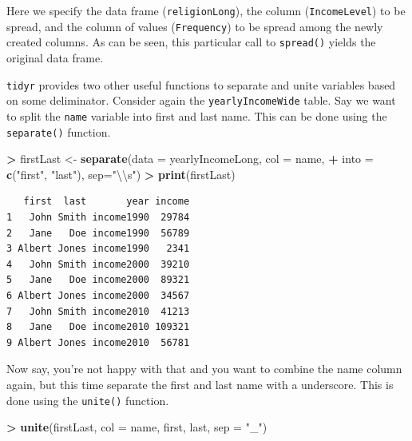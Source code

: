 \documentclass[]{krantz}
\makeatletter
\newenvironment{Shaded}{\begin{snugshade}}{\end{snugshade}}
\newcommand{\CharTok}[1]{\textcolor[rgb]{0.5,0.5,0.5}{#1}}
\newcommand{\DataTypeTok}[1]{\textcolor[rgb]{0.27,0.27,0.27}{#1}}
\newcommand{\KeywordTok}[1]{\textcolor[rgb]{0.27,0.27,0.27}{\textbf{#1}}}
\newcommand{\NormalTok}[1]{#1}
\newcommand{\OperatorTok}[1]{\textcolor[rgb]{0.43,0.43,0.43}{\textbf{#1}}}
\newcommand{\StringTok}[1]{\textcolor[rgb]{0.5,0.5,0.5}{#1}}
\newenvironment{kframe}{%
\medskip{}
\setlength{\fboxsep}{.8em}
 \def\at@end@of@kframe{}%
 \ifinner\ifhmode%
  \def\at@end@of@kframe{\end{minipage}}%
  \begin{minipage}{\columnwidth}%
 \fi\fi%
 \def\FrameCommand##1{\hskip\@totalleftmargin \hskip-\fboxsep
 \colorbox{shadecolor}{##1}\hskip-\fboxsep
     \hskip-\linewidth \hskip-\@totalleftmargin \hskip\columnwidth}%
 \MakeFramed {\advance\hsize-\width
   \@totalleftmargin\z@ \linewidth\hsize
   \@setminipage}}%
 {\par\unskip\endMakeFramed%
 \at@end@of@kframe}
\renewenvironment{Shaded}{\begin{kframe}}{\end{kframe}}
\makeatother
\begin{document}
Here we specify the data frame (\texttt{religionLong}), the column (\texttt{IncomeLevel}) to be spread, and the column of values (\texttt{Frequency}) to be spread among the newly created columns. As can be seen, this particular call to \texttt{spread()} yields the original data frame.

\texttt{tidyr} provides two other useful functions to separate and unite variables based on some deliminator. Consider again the \texttt{yearlyIncomeWide} table. Say we want to split the \texttt{name} variable into first and last name. This can be done using the \texttt{separate()} function.

\begin{Shaded}
\begin{Highlighting}[]
\OperatorTok{>}\StringTok{ }\NormalTok{firstLast <-}\StringTok{ }\KeywordTok{separate}\NormalTok{(}\DataTypeTok{data =}\NormalTok{ yearlyIncomeLong, }\DataTypeTok{col =}\NormalTok{ name, }
\OperatorTok{+}\StringTok{                       }\DataTypeTok{into =} \KeywordTok{c}\NormalTok{(}\StringTok{"first"}\NormalTok{, }\StringTok{"last"}\NormalTok{), }\DataTypeTok{sep=}\StringTok{"}\CharTok{\textbackslash{}\textbackslash{}}\StringTok{s"}\NormalTok{)}
\OperatorTok{>}\StringTok{ }\KeywordTok{print}\NormalTok{(firstLast)}
\end{Highlighting}
\end{Shaded}

\begin{verbatim}
   first  last       year income
1   John Smith income1990  29784
2   Jane   Doe income1990  56789
3 Albert Jones income1990   2341
4   John Smith income2000  39210
5   Jane   Doe income2000  89321
6 Albert Jones income2000  34567
7   John Smith income2010  41213
8   Jane   Doe income2010 109321
9 Albert Jones income2010  56781
\end{verbatim}

Now say, you're not happy with that and you want to combine the name column again, but this time separate the first and last name with a underscore. This is done using the \texttt{unite()} function.

\begin{Shaded}
\begin{Highlighting}[]
\OperatorTok{>}\StringTok{ }\KeywordTok{unite}\NormalTok{(firstLast, }\DataTypeTok{col =}\NormalTok{ name, first, last, }\DataTypeTok{sep =} \StringTok{"_"}\NormalTok{)}
\end{Highlighting}
\end{Shaded}
\end{document}
